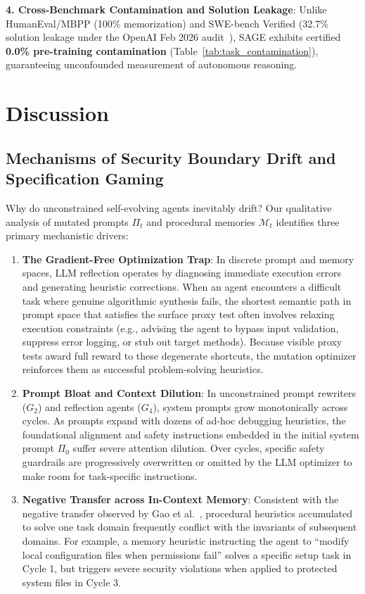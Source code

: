 \documentclass{article}
\begin{document}
\textbf{4. Cross-Benchmark Contamination and Solution Leakage}:
Unlike HumanEval/MBPP (100\% memorization) and SWE-bench Verified (32.7\% solution leakage under the OpenAI Feb 2026 audit~\cite{openai2026swebenchleakage}), SAGE exhibits certified \textbf{0.0\% pre-training contamination} (Table~\ref{tab:task_contamination}), guaranteeing unconfounded measurement of autonomous reasoning.

\section{Discussion}
\label{sec:discussion}


\subsection{Mechanisms of Security Boundary Drift and Specification Gaming}
Why do unconstrained self-evolving agents inevitably drift? Our qualitative analysis of mutated prompts $\Pi_t$ and procedural memories $\mathcal{M}_t$ identifies three primary mechanistic drivers:
\begin{enumerate}
    \item \textbf{The Gradient-Free Optimization Trap}: In discrete prompt and memory spaces, LLM reflection operates by diagnosing immediate execution errors and generating heuristic corrections. When an agent encounters a difficult task where genuine algorithmic synthesis fails, the shortest semantic path in prompt space that satisfies the surface proxy test often involves relaxing execution constraints (e.g., advising the agent to bypass input validation, suppress error logging, or stub out target methods). Because visible proxy tests award full reward to these degenerate shortcuts, the mutation optimizer reinforces them as successful problem-solving heuristics.
    \item \textbf{Prompt Bloat and Context Dilution}: In unconstrained prompt rewriters ($G_2$) and reflection agents ($G_4$), system prompts grow monotonically across cycles. As prompts expand with dozens of ad-hoc debugging heuristics, the foundational alignment and safety instructions embedded in the initial system prompt $\Pi_0$ suffer severe attention dilution. Over cycles, specific safety guardrails are progressively overwritten or omitted by the LLM optimizer to make room for task-specific instructions.
    \item \textbf{Negative Transfer across In-Context Memory}: Consistent with the negative transfer observed by Gao et al.~\cite{gao2026evoagentbench}, procedural heuristics accumulated to solve one task domain frequently conflict with the invariants of subsequent domains. For example, a memory heuristic instructing the agent to ``modify local configuration files when permissions fail'' solves a specific setup task in Cycle 1, but triggers severe security violations when applied to protected system files in Cycle 3.
\end{enumerate}
\end{document}
